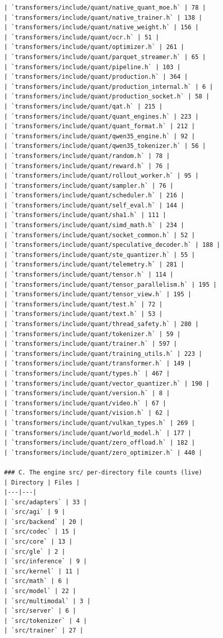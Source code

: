 \begin{Verbatim}[breaklines,breakanywhere,fontsize=\footnotesize]
| `transformers/include/quant/native_quant_moe.h` | 78 |
| `transformers/include/quant/native_trainer.h` | 138 |
| `transformers/include/quant/native_weight.h` | 156 |
| `transformers/include/quant/ocr.h` | 51 |
| `transformers/include/quant/optimizer.h` | 261 |
| `transformers/include/quant/parquet_streamer.h` | 65 |
| `transformers/include/quant/pipeline.h` | 103 |
| `transformers/include/quant/production.h` | 364 |
| `transformers/include/quant/production_internal.h` | 6 |
| `transformers/include/quant/production_socket.h` | 58 |
| `transformers/include/quant/qat.h` | 215 |
| `transformers/include/quant/quant_engines.h` | 223 |
| `transformers/include/quant/quant_format.h` | 212 |
| `transformers/include/quant/qwen35_engine.h` | 92 |
| `transformers/include/quant/qwen35_tokenizer.h` | 56 |
| `transformers/include/quant/random.h` | 78 |
| `transformers/include/quant/reward.h` | 76 |
| `transformers/include/quant/rollout_worker.h` | 95 |
| `transformers/include/quant/sampler.h` | 76 |
| `transformers/include/quant/scheduler.h` | 216 |
| `transformers/include/quant/self_eval.h` | 144 |
| `transformers/include/quant/sha1.h` | 111 |
| `transformers/include/quant/simd_math.h` | 234 |
| `transformers/include/quant/socket_common.h` | 52 |
| `transformers/include/quant/speculative_decoder.h` | 188 |
| `transformers/include/quant/ste_quantizer.h` | 55 |
| `transformers/include/quant/telemetry.h` | 281 |
| `transformers/include/quant/tensor.h` | 114 |
| `transformers/include/quant/tensor_parallelism.h` | 195 |
| `transformers/include/quant/tensor_view.h` | 195 |
| `transformers/include/quant/test.h` | 72 |
| `transformers/include/quant/text.h` | 53 |
| `transformers/include/quant/thread_safety.h` | 280 |
| `transformers/include/quant/tokenizer.h` | 59 |
| `transformers/include/quant/trainer.h` | 597 |
| `transformers/include/quant/training_utils.h` | 223 |
| `transformers/include/quant/transformer.h` | 149 |
| `transformers/include/quant/types.h` | 467 |
| `transformers/include/quant/vector_quantizer.h` | 190 |
| `transformers/include/quant/version.h` | 8 |
| `transformers/include/quant/video.h` | 67 |
| `transformers/include/quant/vision.h` | 62 |
| `transformers/include/quant/vulkan_types.h` | 269 |
| `transformers/include/quant/world_model.h` | 177 |
| `transformers/include/quant/zero_offload.h` | 182 |
| `transformers/include/quant/zero_optimizer.h` | 440 |

### C. The engine src/ per-directory file counts (live)
| Directory | Files |
|---|---|
| `src/adapters` | 33 |
| `src/agi` | 9 |
| `src/backend` | 20 |
| `src/codec` | 15 |
| `src/core` | 13 |
| `src/gle` | 2 |
| `src/inference` | 9 |
| `src/kernel` | 11 |
| `src/math` | 6 |
| `src/model` | 22 |
| `src/multimodal` | 3 |
| `src/server` | 6 |
| `src/tokenizer` | 4 |
| `src/trainer` | 27 |


\end{Verbatim}
